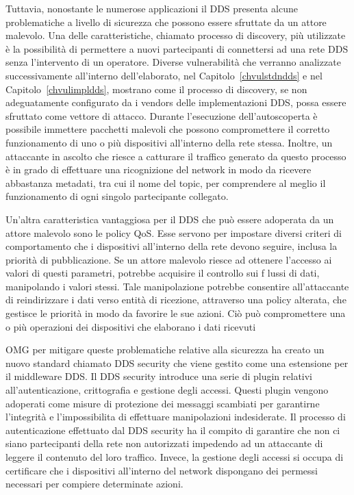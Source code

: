 Tuttavia, nonostante le numerose applicazioni il DDS presenta alcune 
problematiche a livello di sicurezza che possono 
essere sfruttate da un attore malevolo. Una delle 
caratteristiche, chiamato processo di discovery,
più utilizzate è la possibilità di permettere 
a nuovi partecipanti di connettersi ad una rete DDS senza 
l'intervento di un operatore. Diverse vulnerabilità che verranno 
analizzate successivamente all'interno dell'elaborato, nel 
Capitolo~\ref{chvulstdndds} e nel Capitolo~\ref{chvulimpldds}, 
mostrano come il processo di discovery, se non adeguatamente 
configurato da i vendors delle implementazioni DDS, possa 
essere sfruttato come vettore di attacco. Durante 
l'esecuzione dell'autoscoperta è possibile immettere
pacchetti malevoli che possono compromettere il 
corretto funzionamento di uno o più dispositivi all'interno 
della rete stessa. Inoltre, un attaccante in ascolto 
che riesce a catturare 
il traffico generato da questo processo è in grado 
di effettuare una ricognizione del network in modo da 
ricevere abbastanza metadati, tra cui il nome del topic,
per comprendere al meglio 
il funzionamento di ogni singolo partecipante collegato.

Un'altra caratteristica vantaggiosa per il DDS che può 
essere adoperata da un attore malevolo sono le policy QoS.
Esse servono per impostare diversi criteri di
comportamento che i dispositivi all'interno della rete 
devono seguire, inclusa la priorità di pubblicazione.
Se un attore malevolo riesce ad ottenere l'accesso ai valori 
di questi parametri, potrebbe acquisire il controllo sui f
lussi di dati, manipolando i valori stessi. 
Tale manipolazione potrebbe consentire all'attaccante 
di reindirizzare i dati verso entità di ricezione, 
attraverso una policy alterata, 
che gestisce le priorità in modo da favorire le sue azioni. 
Ciò può compromettere una o più operazioni 
dei dispositivi che elaborano i dati ricevuti

OMG per mitigare queste problematiche relative alla sicurezza 
ha creato un nuovo standard chiamato DDS security che viene
gestito come una estensione per il middleware DDS. 
Il DDS security introduce 
una serie di plugin relativi all'autenticazione, crittografia e 
gestione degli accessi. Questi plugin vengono adoperati come misure 
di protezione dei messaggi scambiati per garantirne l'integrità e
l'impossibilita di effettuare manipolazioni indesiderate. 
Il processo di autenticazione effettuato dal DDS security 
ha il compito di garantire che non ci siano partecipanti della 
rete non autorizzati impedendo ad un attaccante di leggere 
il contenuto del loro traffico. Invece, la gestione degli accessi
si occupa di certificare che i dispositivi all'interno del network
dispongano dei permessi necessari per compiere determinate azioni.

